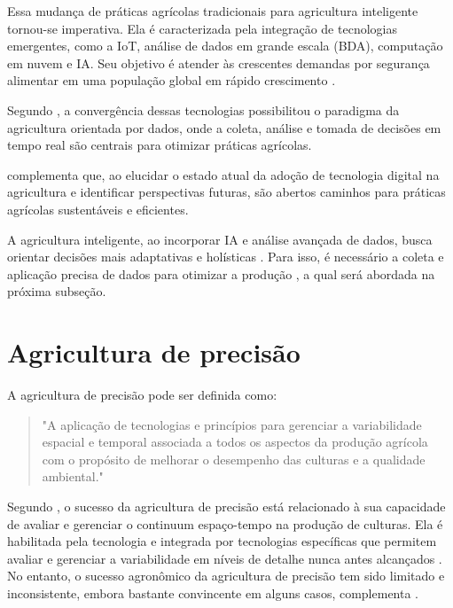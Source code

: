 Essa mudança de práticas agrícolas tradicionais para agricultura inteligente tornou-se imperativa. Ela é caracterizada pela integração de tecnologias emergentes, como a IoT, análise de dados em grande escala (BDA), computação em nuvem e IA. Seu objetivo é atender às crescentes demandas por segurança alimentar em uma população global em rápido crescimento \parencite{Gurjeet_smart2022, Garg_smart2023}.

Segundo \textcite{Garg_smart2023}, a convergência dessas tecnologias possibilitou o paradigma da agricultura orientada por dados, onde a coleta, análise e tomada de decisões em tempo real são centrais para otimizar práticas agrícolas.

\textcite{Gurjeet_smart2022} complementa que, ao elucidar o estado atual da adoção de tecnologia digital na agricultura e identificar perspectivas futuras, são abertos caminhos para práticas agrícolas sustentáveis e eficientes.

A agricultura inteligente, ao incorporar IA e análise avançada de dados, busca orientar decisões mais adaptativas e holísticas \parencite{Garg_smart2023}. Para isso, é necessário a coleta e aplicação precisa de dados para otimizar a produção \parencite{Lamine_precision2024}, a qual será abordada na próxima subseção.

\section{Agricultura de precisão}

A agricultura de precisão pode ser definida como: 

\begin{quote}
  "A aplicação de tecnologias e princípios para gerenciar a variabilidade espacial e temporal associada a todos os aspectos da produção agrícola com o propósito de melhorar o desempenho das culturas e a qualidade ambiental." \parencite{Pierce_precision1999}
\end{quote}

Segundo \textcite{Pierce_precision1999}, o sucesso da agricultura de precisão está relacionado à sua capacidade de avaliar e gerenciar o continuum espaço-tempo na produção de culturas. Ela é habilitada pela tecnologia e integrada por tecnologias específicas que permitem avaliar e gerenciar a variabilidade em níveis de detalhe nunca antes alcançados \parencite{Zhang_precision2002}. No entanto, o sucesso agronômico da agricultura de precisão tem sido limitado e inconsistente, embora bastante convincente em alguns casos, complementa \textcite{Zhang_precision2002}.

